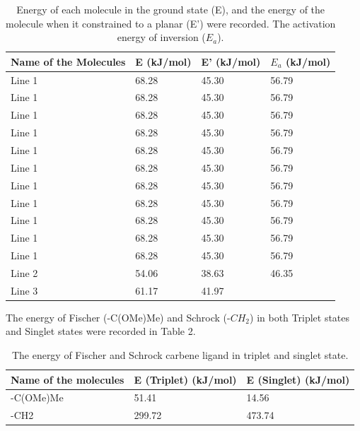 \documentclass[twocolumn]{article} %
\begin{document}
\begin{table}[h] 
\caption{Energy of each molecule in the ground state (E), and the energy of the molecule when it constrained to a planar (E') were recorded. The activation energy of inversion ($E_a$).}
\begin{tabular}{L{.7in}C{.7in}C{.7in}C{.7in}}\toprule
 Name of the Molecules & E (kJ/mol) & E' (kJ/mol) & $E_a$ (kJ/mol)\\\midrule
Line 1 & 68.28 & 45.30 & 56.79 \\
Line 1 & 68.28 & 45.30 & 56.79 \\
Line 1 & 68.28 & 45.30 & 56.79 \\
Line 1 & 68.28 & 45.30 & 56.79 \\
Line 1 & 68.28 & 45.30 & 56.79 \\
Line 1 & 68.28 & 45.30 & 56.79 \\
Line 1 & 68.28 & 45.30 & 56.79 \\
Line 1 & 68.28 & 45.30 & 56.79 \\
Line 1 & 68.28 & 45.30 & 56.79 \\
Line 1 & 68.28 & 45.30 & 56.79 \\
Line 1 & 68.28 & 45.30 & 56.79 \\
Line 2 & 54.06 & 38.63 & 46.35 \\\midrule %
Line 3 & 61.17 & 41.97 & \\\bottomrule

\end{tabular}
\end{table}



The energy of Fischer (-C(OMe)Me) and Schrock (-$CH_2$) in both Triplet states and Singlet states were recorded in Table 2. 


\begin{table}[h]
\caption{The energy of Fischer and Schrock carbene ligand in triplet and singlet state.}
\begin{tabular}{L{1.0in}C{1.0in}C{1.0in}}\toprule
Name of the molecules & E (Triplet) (kJ/mol) & E (Singlet) (kJ/mol)\\ \hline
-C(OMe)Me             & 51.41         & 14.56         \\
-CH2                  & 299.72        & 473.74    \\\bottomrule   
\end{tabular}
\end{table}
\end{document}
